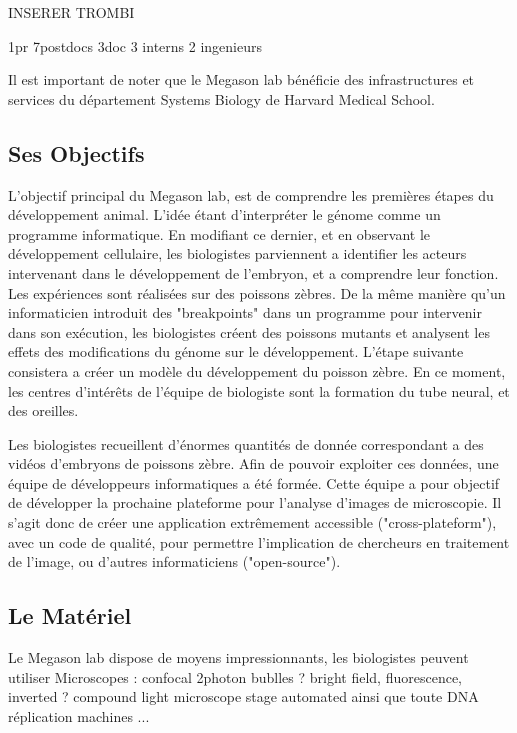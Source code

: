 INSERER TROMBI

1pr
7postdocs
3doc
3 interns
2 ingenieurs

Il est important de noter que le Megason lab bénéficie des infrastructures et services du département Systems Biology de Harvard Medical School.


\subsection{Ses Objectifs}         %
L'objectif principal du Megason lab, est de comprendre les premières étapes du développement animal.
L'idée étant d'interpréter le génome comme un programme informatique. En modifiant ce dernier, et en observant le développement cellulaire, les biologistes parviennent a identifier les acteurs intervenant dans le développement de l'embryon, et a comprendre leur fonction.
Les expériences sont réalisées sur des poissons zèbres. De la même manière qu'un informaticien introduit des "breakpoints" dans un programme pour intervenir dans son exécution, les biologistes créent des poissons mutants et analysent les effets des modifications du génome sur le développement.
L'étape suivante consistera a créer un modèle du développement du poisson zèbre. En ce moment, les centres d'intérêts de l'équipe de biologiste sont la formation du tube neural, et des oreilles.

Les biologistes recueillent d'énormes quantités de donnée correspondant a des vidéos d'embryons de poissons zèbre. Afin de pouvoir exploiter ces données, une équipe de développeurs informatiques a été formée. Cette équipe a pour objectif de développer la prochaine plateforme pour l'analyse d'images de microscopie. Il s'agit donc de créer une application extrêmement accessible ("cross-plateform"), avec un code de qualité, pour permettre l'implication de chercheurs en traitement de l'image, ou d'autres informaticiens ("open-source").

\subsection{Le Matériel} 
Le Megason lab dispose de moyens impressionnants, les biologistes peuvent utiliser
Microscopes :
confocal 2photon
bublles ? bright field, fluorescence, inverted ? compound light microscope stage automated
ainsi que toute 
DNA réplication machines ...











